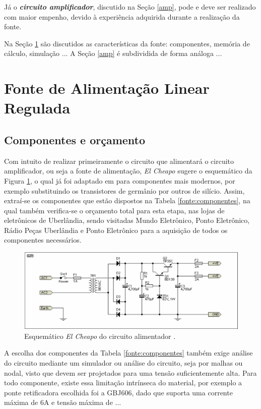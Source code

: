 \documentclass[a4paper,12pt,oneside,openany,table,xcdraw]{article}
\begin{document}
Já o \textbf{\textit{circuito amplificador}}, discutido na Seção \ref{amp}, pode e deve ser realizado com maior empenho, devido à experiência adquirida durante a realização da fonte. 

Na Seção \ref{fonte} são discutidos as características da fonte: componentes, memória de cálculo, simulação ...
A Seção \ref{amp} é subdividida de forma análoga ... 

\newpage
\section{Fonte de Alimentação Linear Regulada} \label{fonte}

\subsection{Componentes e orçamento} 
Com intuito de realizar primeiramente o circuito que alimentará o circuito amplificador, ou seja a fonte de alimentação, \emph{El Cheapo} sugere o esquemático da Figura \ref{fonte:esquematico}, o qual já foi adaptado em \cite{cheapo} para componentes mais modernos, por exemplo substituindo os transistores de germânio por outros de silício. Assim, extraí-se os componentes que estão dispostos na Tabela \ref{fonte:componentes}, na qual também verifica-se o orçamento total para esta etapa, nas lojas de eletrônicos de Uberlândia, sendo visitadas Mundo Eletrônico, Ponto Eletrônico, Rádio Peças Uberlândia e Ponto Eletrônico para a aquisição de todos os componentes necessários.
\vspace{0.2cm}

\begin{figure}[H]
\centering
\includegraphics[width=15cm]{fonte-esquematico}
\caption{Esquemático \emph{El Cheapo} do circuito alimentador \cite{cheapo}.}
\label{fonte:esquematico}
\end{figure}
\vspace{0.4cm}

A escolha dos componentes da Tabela \ref{fonte:componentes} também exige análise do circuito mediante um simulador ou análise do circuito, seja por malhas ou nodal, visto que devem ser projetados para uma tensão suficientemente alta. Para todo componente, existe essa limitação intrínseca do material, por exemplo a ponte retificadora escolhida foi a GBJ606, dado que suporta uma corrente máxima de 6A e tensão máxima de ...
\end{document}
